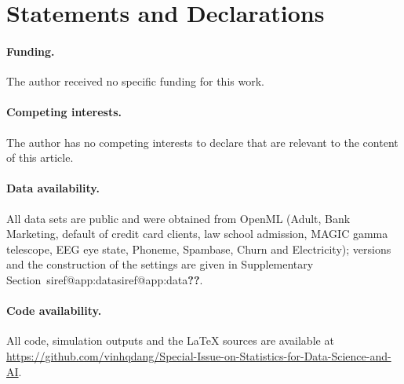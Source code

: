 \documentclass[pdflatex,sn-mathphys-num,iicol]{sn-jnl}
\makeatletter
\theoremstyle{thmstyleone}
\theoremstyle{thmstyletwo}
\theoremstyle{thmstylethree}
\newcommand{\SIref}[1]{\ifcsname siref@#1\endcsname\csname siref@#1\endcsname\else\textbf{??}\fi}
\makeatother
\begin{document}
\section*{Statements and Declarations}
\paragraph{Funding.} The author received no specific funding for this work.
\paragraph{Competing interests.} The author has no competing interests to declare that are relevant to the content of this article.
\paragraph{Data availability.} All data sets are public and were obtained from OpenML (Adult, Bank Marketing, default of credit card clients, law school admission, MAGIC gamma telescope, EEG eye state, Phoneme, Spambase, Churn and Electricity); versions and the construction of the settings are given in Supplementary Section~\SIref{app:data}.
\paragraph{Code availability.} All code, simulation outputs and the \LaTeX{} sources are available at \url{https://github.com/vinhqdang/Special-Issue-on-Statistics-for-Data-Science-and-AI}.


\end{document}
